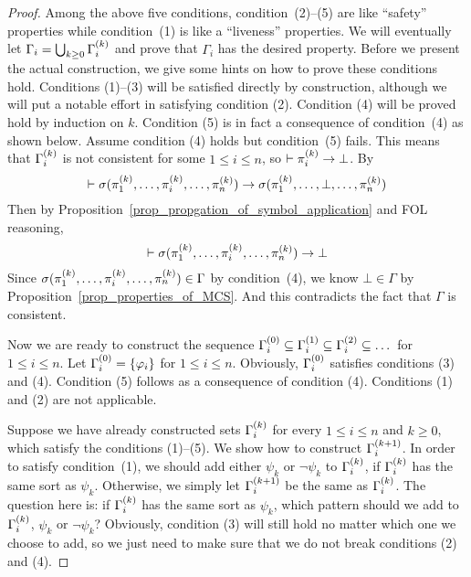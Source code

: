 \documentclass{amsart}
\begin{document}
\begin{proof}
Among the above five conditions, 
condition~(2)--(5) are like ``safety'' properties
while condition~(1) is like a ``liveness'' properties.
We will eventually let $\Gamma_i = \bigcup_{k \ge 0} \Gamma_i^{(k)}$ and prove that
$\Gamma_i$ has the desired property.
Before we present the actual construction, 
we give some hints on how to prove these conditions hold.
Conditions (1)--(3) will be satisfied directly by construction, although
we will put a notable effort in 
satisfying condition (2).
Condition (4) will be proved hold by induction
on $k$.
Condition (5) is in fact a consequence of condition~(4)
as shown below.
Assume condition (4) holds but condition~(5) fails.
This means that $\Gamma_i^{(k)}$ is not consistent for some $1 \le i \le n$,
so $\vdash \pi_i^{(k)} \to \bot$.
By \framing
$$\vdash \sigma(\pi_1^{(k)} ,\dots, \pi_i^{(k)} ,\dots, \pi_n^{(k)}) \to
        \sigma(\pi_1^{(k)} ,\dots, \bot ,\dots, \pi_n^{(k)})$$
Then by Proposition~\ref{prop_propgation_of_symbol_application}
and FOL reasoning,
$$\vdash \sigma(\pi_1^{(k)} ,\dots, \pi_i^{(k)} ,\dots, \pi_n^{(k)}) \to
        \bot$$
Since $\sigma(\pi_1^{(k)} ,\dots, \pi_i^{(k)} ,\dots, \pi_n^{(k)}) \in \Gamma$
by condition~(4), 
we know $\bot \in \Gamma$
by Proposition~\ref{prop_properties_of_MCS}.
And this contradicts the fact that $\Gamma$ is consistent.

Now we are ready to construct the sequence
$\Gamma_i^{(0)} \subseteq \Gamma_i^{(1)} \subseteq \Gamma_i^{(2)} \subseteq \dots$ 
for $1 \le i \le n$.
Let
$\Gamma_i^{(0)} = \{ \varphi_i \}$ for $1 \le i \le n$.
Obviously,
$\Gamma_i^{(0)}$ satisfies conditions (3) and (4).
Condition (5) follows as a consequence
of condition (4).
Conditions (1) and (2) are not applicable.


Suppose we have already constructed
sets $\Gamma_i^{(k)}$ for every $1 \le i \le n$ and $k \ge 0$,
which satisfy the conditions (1)--(5).
We show how to construct $\Gamma_i^{(k+1)}$.
In order to satisfy condition~(1),
we should add either $\psi_k$ or $\neg \psi_k$ to
$\Gamma_i^{(k)}$, if $\Gamma_i^{(k)}$ has the same sort as $\psi_k$.
Otherwise, we simply let $\Gamma_i^{(k+1)}$ be the same as
$\Gamma_i^{(k)}$.
The question here is: if $\Gamma_i^{(k)}$ has the same sort as $\psi_k$,
which pattern should we add to $\Gamma_i^{(k)}$, 
$\psi_k$ or $\neg \psi_k$?
Obviously, condition (3) will still hold no matter which one we choose
to add,
so we just need to make sure that we do not break
conditions (2) and (4).


\end{proof}
\end{document}
